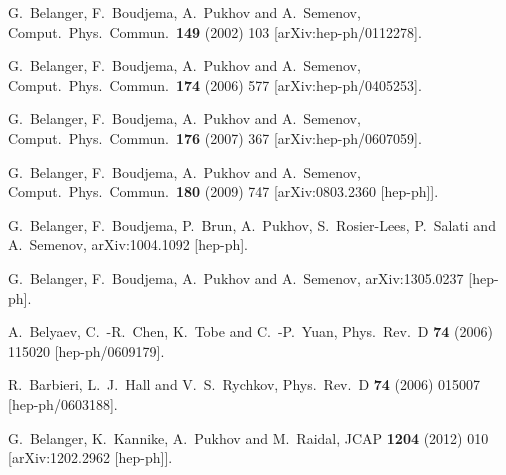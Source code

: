 \documentclass[12pt,a4paper]{article}
\begin{document}
\begin{thebibliography}{}



  G.~Belanger, F.~Boudjema, A.~Pukhov and A.~Semenov,
  Comput.\ Phys.\ Commun.\  {\bf 149} (2002) 103
  [arXiv:hep-ph/0112278].

  G.~Belanger, F.~Boudjema, A.~Pukhov and A.~Semenov,
  Comput.\ Phys.\ Commun.\  {\bf 174} (2006) 577
  [arXiv:hep-ph/0405253].

  G.~Belanger, F.~Boudjema, A.~Pukhov and A.~Semenov,
  Comput.\ Phys.\ Commun.\  {\bf 176} (2007) 367
  [arXiv:hep-ph/0607059].

  G.~Belanger, F.~Boudjema, A.~Pukhov and A.~Semenov,
  Comput.\ Phys.\ Commun.\  {\bf 180} (2009) 747
  [arXiv:0803.2360 [hep-ph]].



  G.~Belanger, F.~Boudjema, P.~Brun, A.~Pukhov, S.~Rosier-Lees, P.~Salati and A.~Semenov,
  arXiv:1004.1092 [hep-ph].
  
  G.~Belanger, F.~Boudjema, A.~Pukhov and A.~Semenov,
  arXiv:1305.0237 [hep-ph].
  
  A.~Belyaev, C.~-R.~Chen, K.~Tobe and C.~-P.~Yuan,
  Phys.\ Rev.\ D {\bf 74} (2006) 115020
  [hep-ph/0609179].
  
  R.~Barbieri, L.~J.~Hall and V.~S.~Rychkov,
  Phys.\ Rev.\ D {\bf 74} (2006) 015007
  [hep-ph/0603188].


  G.~Belanger, K.~Kannike, A.~Pukhov and M.~Raidal,
  JCAP {\bf 1204} (2012) 010
  [arXiv:1202.2962 [hep-ph]].


\end{thebibliography}
\end{document}
